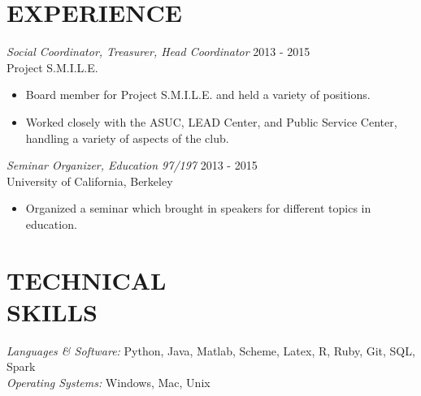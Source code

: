 \documentclass[margin]{res}
\begin{document}
\begin{resume}
\section{EXPERIENCE} {\sl Social Coordinator, Treasurer, Head Coordinator} \hfill            2013 - 2015\\
                Project S.M.I.L.E.
                 \begin{itemize}  \itemsep -2pt %
                 \item Board member for Project S.M.I.L.E. and
                                held a variety of positions.
                \item Worked closely with the ASUC, LEAD Center, and Public Service Center, handling a variety of aspects of the club.
                 \end{itemize}
                {\sl Seminar Organizer, Education 97/197} \hfill                       2013 - 2015\\
                University of California, Berkeley
                \begin{itemize} \itemsep -2pt
                \item Organized a seminar which brought in speakers for different topics in education.
                \end{itemize}

\section{TECHNICAL \\ SKILLS} {\sl Languages \& Software:} Python, Java, Matlab, 
         Scheme, Latex, R, Ruby, Git, SQL, Spark\\
                {\sl Operating Systems:} Windows, Mac, Unix
								

\end{resume}
\end{document}
